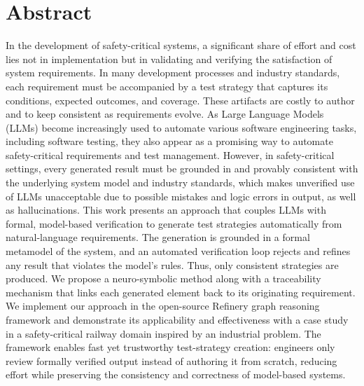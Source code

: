 \vfill
\selectenglish


\chapter*{Abstract}

In the development of safety-critical systems, a significant share of effort and cost lies not in implementation but in validating and verifying the satisfaction of system requirements. In many development processes and industry standards, each requirement must be accompanied by a test strategy that captures its conditions, expected outcomes, and coverage. These artifacts are costly to author and to keep consistent as requirements evolve. As Large Language Models (LLMs) become increasingly used to automate various software engineering tasks, including software testing, they also appear as a promising way to automate safety-critical requirements and test management. However, in safety-critical settings, every generated result must be grounded in and provably consistent with the underlying system model and industry standards, which makes unverified use of LLMs unacceptable due to possible mistakes and logic errors in output, as well as hallucinations. This work presents an approach that couples LLMs with formal, model-based verification to generate test strategies automatically from natural-language requirements. The generation is grounded in a formal metamodel of the system, and an automated verification loop rejects and refines any result that violates the model's rules. Thus, only consistent strategies are produced. We propose a neuro-symbolic method along with a traceability mechanism that links each generated element back to its originating requirement. We implement our approach in the open-source Refinery graph reasoning framework and demonstrate its applicability and effectiveness with a case study in a safety-critical railway domain inspired by an industrial problem. The framework enables fast yet trustworthy test-strategy creation: engineers only review formally verified output instead of authoring it from scratch, reducing effort while preserving the consistency and correctness of model-based systems. 

\vfill
\cleardoublepage

\selectthesislanguage

\setcounter{romanPage}{\value{page}}
